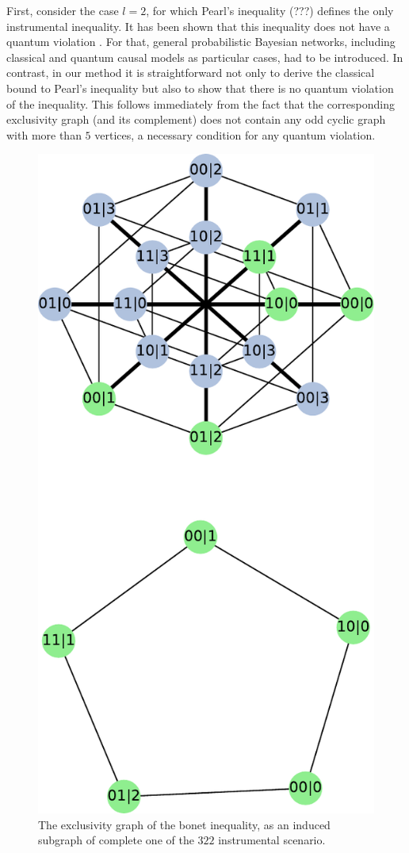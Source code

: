 \documentclass[letterpaper]{article}
\begin{document}
First, consider the case $l=2$, for which Pearl's inequality (???) defines the
only instrumental inequality. It has been shown that this inequality does not
have a quantum violation \cite{}. For that, general probabilistic Bayesian
networks, including classical and quantum causal models as particular cases, had
to be introduced. In contrast, in our method it is straightforward not only to
derive the classical bound to Pearl's inequality 
but also to show that there is no quantum violation of the
inequality. This follows immediately from the fact that the corresponding
exclusivity graph (and its complement) does not contain any odd cyclic graph
with more than $5$ vertices, a necessary condition for any quantum violation.  

\begin{figure}[h]
    \centering
    \includegraphics[width=.8\columnwidth]{images/instrumental_c5.pdf}
    \caption{The exclusivity graph of the bonet inequality, as an induced
    subgraph of complete one of the $322$ instrumental scenario.}
    \label{fig:bonetexc}
\end{figure}
\end{document}
